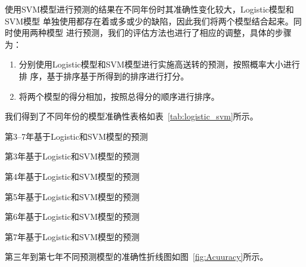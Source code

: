 \documentclass[../main]{subfiles}
\begin{document}
使用SVM模型进行预测的结果在不同年份时其准确性变化较大，Logistic模型和SVM模型
单独使用都存在着或多或少的缺陷，因此我们将两个模型结合起来。同时使用两种模型
进行预测，我们的评估方法也进行了相应的调整，具体的步骤为：

\begin{enumerate}
  \item 分别使用Logistic模型和SVM模型进行实施高送转的预测，按照概率大小进行排
    序，基于排序基于所得到的排序进行打分。
  \item 将两个模型的得分相加，按照总得分的顺序进行排序。
\end{enumerate}

我们得到了不同年份的模型准确性表格如表~\ref{tab:logistic_svm}所示。

\begin{table}[htpb]
  \centering
  \caption{第3--7年基于Logistic和SVM模型的预测}%
  \label{tab:logistic_svm}
  \setlength\tabcolsep{2pt}
  \begin{subtable}[htbp]{0.45\linewidth}
    \centering
    \caption{第3年基于Logistic和SVM模型的预测}%
    \label{tab:logistic_svm3}
  \end{subtable}
  \qquad
  \begin{subtable}[htbp]{0.45\linewidth}
    \centering
    \caption{第4年基于Logistic和SVM模型的预测}%
    \label{tab:logistic_svm4}
  \end{subtable}

  \begin{subtable}[htbp]{0.45\linewidth}
    \centering
    \caption{第5年基于Logistic和SVM模型的预测}%
    \label{tab:logistic_svm5}
  \end{subtable}
  \qquad
  \begin{subtable}[htbp]{0.45\linewidth}
    \centering
    \caption{第6年基于Logistic和SVM模型的预测}%
    \label{tab:logistic_svm6}
  \end{subtable}

  \begin{subtable}[htbp]{0.45\linewidth}
    \centering
    \caption{第7年基于Logistic和SVM模型的预测}%
    \label{tab:logistic_svm7}
  \end{subtable}
\end{table}

第三年到第七年不同预测模型的准确性折线图如图~\ref{fig:Acuuracy}所示。
\end{document}
